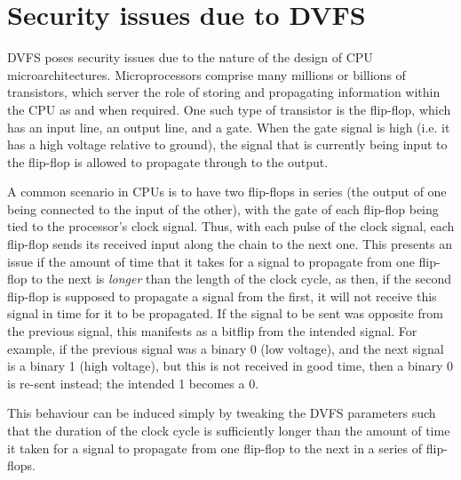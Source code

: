 \section{Security issues due to DVFS}

DVFS poses security issues due to the nature of the design of CPU
microarchitectures. Microprocessors comprise many millions or billions of
transistors, which server the role of storing and propagating information within
the CPU as and when required. One such type of transistor is the flip-flop,
which has an input line, an output line, and a gate. When the gate signal is
high (i.e. it has a high voltage relative to ground), the signal that is
currently being input to the flip-flop is allowed to propagate through to the
output.

A common scenario in CPUs is to have two flip-flops in series (the
output of one being connected to the input of the other), with the gate of each
flip-flop being tied to the processor's clock signal. Thus, with each pulse of
the clock signal, each flip-flop sends its received input along the chain to the
next one. This presents an issue if the amount of time that it takes for a
signal to propagate from one flip-flop to the next is \emph{longer} than the
length of the clock cycle, as then, if the second flip-flop is supposed to
propagate a signal from the first, it will not receive this signal in time for
it to be propagated. If the signal to be sent was opposite from the previous
signal, this manifests as a bitflip from the intended signal. For example, if
the previous signal was a binary 0 (low voltage), and the next signal is a
binary 1 (high voltage), but this is not received in good time, then a binary 0
is re-sent instead; the intended 1 becomes a 0.

This behaviour can be induced simply by tweaking the DVFS parameters such that
the duration of the clock cycle is sufficiently longer than the amount of time
it taken for a signal to propagate from one flip-flop to the next in a series
of flip-flops.
